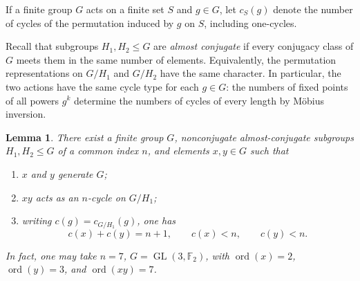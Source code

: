 \documentclass[11pt,letterpaper,reqno]{amsart}
\newtheorem{lemma}[lemma]{Lemma}
\theoremstyle{definition}
\newcommand{\Ftwo}{\mathbb F_2}
\begin{document}
If a finite group $G$ acts on a finite set $S$ and $g\in G$, let
$c_S(g)$ denote the number of cycles of the permutation induced by
$g$ on $S$, including one-cycles.

Recall that subgroups $H_1,H_2\leq G$ are \emph{almost conjugate} if
every conjugacy class of $G$ meets them in the same number of
elements.  Equivalently, the permutation representations on
$G/H_1$ and $G/H_2$ have the same character. In particular, the two actions have the
same cycle type for each $g\in G$: the numbers of fixed points of all
powers $g^k$ determine the numbers of cycles of every length by
M\"obius inversion.

\begin{lemma}
\label{lem:group-input}
There exist a finite group $G$, nonconjugate almost-conjugate
subgroups $H_1,H_2\leq G$ of a common index $n$, and elements
$x,y\in G$ such that
\begin{enumerate}[label=\textup{(\alph*)}]
\item $x$ and $y$ generate $G$;
\item $xy$ acts as an $n$-cycle on $G/H_1$;
\item writing $c(g)=c_{G/H_1}(g)$, one has
\[
c(x)+c(y)=n+1,
\qquad
c(x)<n,
\qquad
c(y)<n.
\]
\end{enumerate}
In fact, one may take $n=7$,
$G=\operatorname{GL}(3,\Ftwo)$, with
$\operatorname{ord}(x)=2$, $\operatorname{ord}(y)=3$, and
$\operatorname{ord}(xy)=7$.
\end{lemma}
\end{document}
